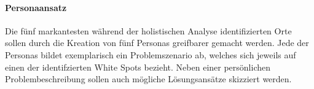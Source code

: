 \paragraph*{Personaansatz}
\label{personaansatz}

Die fünf markantesten während der holistischen Analyse identifizierten Orte sollen durch die Kreation von fünf Personas greifbarer gemacht werden. Jede der Personas bildet exemplarisch ein Problemszenario ab, welches sich jeweils auf einen der identifzierten White Spots bezieht. Neben einer persönlichen Problembeschreibung sollen auch mögliche Lösungsansätze skizziert werden.